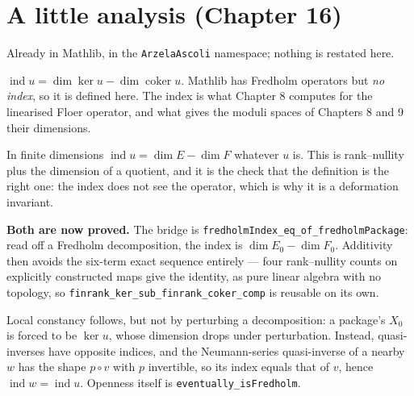 \chapter{A little analysis (Chapter 16)}

\begin{theorem}
  \label{thm:16.1.1}
  \leanok
  Already in Mathlib, in the \texttt{ArzelaAscoli} namespace; nothing is
  restated here.
\end{theorem}

\begin{definition}
  \label{def:16.2.a}
  \leanok
  $\operatorname{ind} u = \dim\ker u - \dim\operatorname{coker} u$.  Mathlib has
  Fredholm operators but \emph{no index}, so it is defined here.  The index is
  what Chapter 8 computes for the linearised Floer operator, and what gives the
  moduli spaces of Chapters 8 and 9 their dimensions.
\end{definition}

\begin{proposition}
  \label{prop:16.2.fd}
  \leanok
  In finite dimensions $\operatorname{ind} u = \dim E - \dim F$ whatever $u$ is.
  This is rank--nullity plus the dimension of a quotient, and it is the check
  that the definition is the right one: the index does not see the operator,
  which is why it is a deformation invariant.
\end{proposition}

\begin{theorem}
  \label{thm:16.2.stability}
  \leanok
  \textbf{Both are now proved.}  The bridge is
  \texttt{fredholmIndex\_eq\_of\_fredholmPackage}: read off a Fredholm
  decomposition, the index is $\dim E_0 - \dim F_0$.  Additivity then avoids the
  six-term exact sequence entirely --- four rank--nullity counts on explicitly
  constructed maps give the identity, as pure linear algebra with no topology, so
  \texttt{finrank\_ker\_sub\_finrank\_coker\_comp} is reusable on its own.

  Local constancy follows, but not by perturbing a decomposition: a package's
  $X_0$ is forced to be $\ker u$, whose dimension drops under perturbation.
  Instead, quasi-inverses have opposite indices, and the Neumann-series
  quasi-inverse of a nearby $w$ has the shape $p\circ v$ with $p$ invertible, so
  its index equals that of $v$, hence $\operatorname{ind} w = \operatorname{ind} u$.
  Openness itself is \texttt{eventually\_isFredholm}.
\end{theorem}

